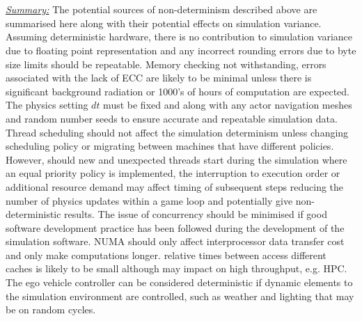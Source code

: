 \documentclass[letterpaper, 10 pt, journal, twoside]{IEEEtran}
\begin{document}
\\\\
\noindent\underline{\textit{Summary:}}
The potential sources of non-determinism described above are summarised here along with their potential effects on simulation variance.  Assuming deterministic hardware, there is no contribution to simulation variance due to floating point representation and any incorrect rounding errors due to byte size limits should be repeatable. Memory checking not withstanding, errors associated with the lack of ECC are likely to be minimal unless there is significant background radiation or 1000's of hours of computation are expected.
%
The physics setting $dt$ must be fixed and along with any actor navigation meshes and random number seeds to ensure accurate and repeatable simulation data.  
%
Thread scheduling should not affect the simulation determinism unless changing scheduling policy or migrating between machines that have different policies. However, should new and unexpected threads start during the simulation where an equal priority policy is implemented, the interruption to execution order or additional resource demand may affect timing of subsequent steps reducing the number of physics updates within a game loop and potentially give non-deterministic results. 
%
The issue of concurrency should be minimised if good software development practice has been followed during the development of the simulation software. 
%
NUMA should only affect interprocessor data transfer cost and only make computations longer. relative times between access different caches is likely to be small although may impact on high throughput, e.g. HPC. 
%
The ego vehicle controller can be considered deterministic if dynamic elements to the simulation environment are controlled, such as weather and lighting that may be on random cycles. 
%
\end{document}
